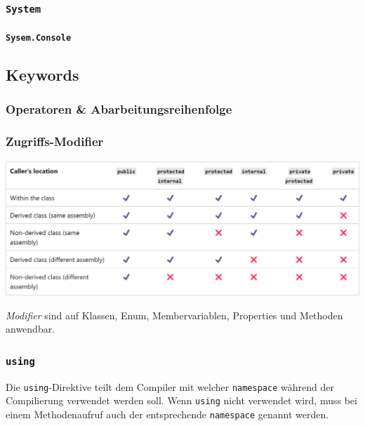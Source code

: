 \documentclass[
  letterpaper,
  DIV=11,
  numbers=noendperiod]{scrartcl}
\let\oldparagraph\paragraph
\renewcommand{\paragraph}[1]{\oldparagraph{#1}\mbox{}}
\begin{document}
\begin{multicols}{2}
\hypertarget{system}{%
\subsubsection{\texorpdfstring{\texttt{System}}{System}}\label{system}}

\hypertarget{sysem.console}{%
\paragraph{\texorpdfstring{\texttt{Sysem.Console}}{Sysem.Console}}\label{sysem.console}}

\hypertarget{keywords}{%
\subsection{Keywords}\label{keywords}}

\hypertarget{operatoren-abarbeitungsreihenfolge}{%
\subsubsection{Operatoren \&
Abarbeitungsreihenfolge}\label{operatoren-abarbeitungsreihenfolge}}

\hypertarget{sec-modifier}{%
\subsubsection{Zugriffs-Modifier}\label{sec-modifier}}

\includegraphics{images/AccessModifiers.png}

\emph{Modifier} sind auf Klassen, Enum, Membervariablen, Properties und
Methoden anwendbar.

\hypertarget{using}{%
\subsubsection{\texorpdfstring{\texttt{using}}{using}}\label{using}}

Die \texttt{using}-Direktive teilt dem Compiler mit welcher
\texttt{namespace} während der Compilierung verwendet werden soll. Wenn
\texttt{using} nicht verwendet wird, muss bei einem Methodenaufruf auch
der entsprechende \texttt{namespace} genannt werden.


\end{multicols}
\end{document}
